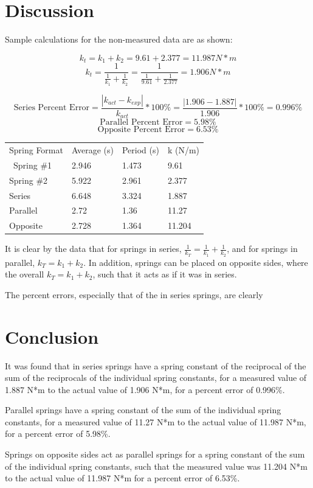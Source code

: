 \documentclass[11pt, titlepage]{article}
\begin{document}
\section*{Discussion}
Sample calculations for the non-measured data are as shown:

$$k_t = k_1 + k_2 = 9.61 + 2.377 = 11.987 N*m$$
$$k_t = \frac{1}{\frac{1}{k_1} + \frac{1}{k_2}} = \frac{1}{\frac{1}{9.61} + \frac{1}{2.377}} = 1.906 N*m$$

$$\text{Series Percent Error} = \frac{|k_{act} - k_{exp}|}{k_{act}} * 100\% = \frac{|1.906 - 1.887|}{1.906} * 100\% = 0.996\% $$ 
$$\text{Parallel Percent Error} = 5.98\% $$
$$\text{Opposite Percent Error} = 6.53\% $$

\begin{center}
\begin{tabular}
{|m{8em}|m{8em}|m{8em}|m{8em}|}
Spring Format & Average (s) & Period (s) & k (N/m) \\\
Spring \#1 & 2.946 & 1.473 & 9.61 \\
Spring \#2 & 5.922 & 2.961 & 2.377 \\
Series & 6.648 & 3.324 & 1.887 \\
Parallel & 2.72 & 1.36 & 11.27 \\
Opposite & 2.728 & 1.364 & 11.204 \\
\end{tabular}
\end{center}

It is clear by the data that for springs in series, $\frac{1}{k_T} = \frac{1}{k_1} + \frac{1}{k_2}$, and for springs in parallel, $k_T = k_1 + k_2$. In addition, springs can be placed on opposite sides, where the overall $k_T = k_1 + k_2$, such that it acts as if it was in series.

The percent errors, especially that of the in series springs, are clearly %

\section*{Conclusion}
It was found that in series springs have a spring constant of the reciprocal of the sum of the reciprocals of the individual spring constants, for a measured value of 1.887 N*m to the actual value of 1.906 N*m, for a percent error of 0.996\%.

Parallel springs have a spring constant of the sum of the individual spring constants, for a measured value of 11.27 N*m to the actual value of 11.987 N*m, for a percent error of 5.98\%.

Springs on opposite sides act as parallel springs for a spring constant of the sum of the individual spring constants, such that the measured value was 11.204 N*m to the actual value of 11.987 N*m for a percent error of 6.53\%.
\end{document}
